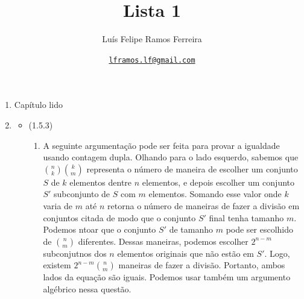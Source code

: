 \documentclass{article}
\title{Lista 1}
\author{Luís Felipe Ramos Ferreira}
\date{\href{mailto:lframos.lf@gmail.com}{\texttt{lframos.lf@gmail.com}}
}
\begin{document}
\maketitle

\begin{enumerate}

	\item Capítulo lido
	\item
	      \begin{itemize}
		      \item (1.5.3)
		            \begin{enumerate}
			            \item
			                  A seguinte argumentação pode ser feita para provar a igualdade usando contagem dupla.
			                  Olhando para o lado esquerdo, sabemos que \(\binom{n}{k} \binom{k}{m}\) representa o número de maneira de escolher
			                  um conjunto \(S\) de \(k\) elementos dentre \(n\) elementos, e depois escolher um conjunto \(S'\) subconjunto de \(S\) com \(m\)
			                  elementos. Somando esse valor onde \(k\) varia de \(m\) até \(n\) retorna o número de maneiras de fazer a divisão em conjuntos citada
			                  de modo que o conjunto \(S'\) final tenha tamanho \(m\).
			                  Podemos ntoar que o conjunto \(S'\) de tamanho \(m\) pode ser escolhido de \(\binom{n}{m}\) diferentes.
			                  Dessas maneiras, podemos escolher \(2^{n - m}\) subconjutnos dos \(n\) elementos originais que não estão em \(S'\). Logo, existem
			                  \(2^{n - m} \binom{n}{m}\) maneiras de fazer a divisão. Portanto, ambos lados da equação são iguais.
			                  Podemos usar também um argumento algébrico nessa questão.


\end{enumerate}
\end{itemize}
\end{enumerate}
\end{document}
